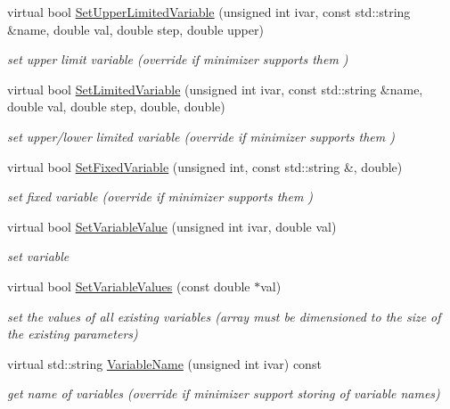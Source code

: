 \begin{DoxyCompactItemize}
virtual bool \mbox{\hyperlink{classROOT_1_1Minuit2_1_1Minuit2Minimizer_a70209b37c419af5d8d1475ce8de29b43}{Set\+Upper\+Limited\+Variable}} (unsigned int ivar, const std\+::string \&name, double val, double step, double upper)
\begin{DoxyCompactList}\small\item\em set upper limit variable (override if minimizer supports them ) \end{DoxyCompactList}\item 
virtual bool \mbox{\hyperlink{classROOT_1_1Minuit2_1_1Minuit2Minimizer_a30385295df6a6b784aa59de7f00e4d23}{Set\+Limited\+Variable}} (unsigned int ivar, const std\+::string \&name, double val, double step, double, double)
\begin{DoxyCompactList}\small\item\em set upper/lower limited variable (override if minimizer supports them ) \end{DoxyCompactList}\item 
virtual bool \mbox{\hyperlink{classROOT_1_1Minuit2_1_1Minuit2Minimizer_af42341b80ebb02d8c0882beaa781e7bd}{Set\+Fixed\+Variable}} (unsigned int, const std\+::string \&, double)
\begin{DoxyCompactList}\small\item\em set fixed variable (override if minimizer supports them ) \end{DoxyCompactList}\item 
virtual bool \mbox{\hyperlink{classROOT_1_1Minuit2_1_1Minuit2Minimizer_a474e05b30c1227e9cc39fb597027f426}{Set\+Variable\+Value}} (unsigned int ivar, double val)
\begin{DoxyCompactList}\small\item\em set variable \end{DoxyCompactList}\item 
virtual bool \mbox{\hyperlink{classROOT_1_1Minuit2_1_1Minuit2Minimizer_a9511e9711f3d1505556af30046c87d03}{Set\+Variable\+Values}} (const double $\ast$val)
\begin{DoxyCompactList}\small\item\em set the values of all existing variables (array must be dimensioned to the size of the existing parameters) \end{DoxyCompactList}\item 
virtual std\+::string \mbox{\hyperlink{classROOT_1_1Minuit2_1_1Minuit2Minimizer_a8f5a6dc65fdfeb0351039d80f7c94968}{Variable\+Name}} (unsigned int ivar) const
\begin{DoxyCompactList}\small\item\em get name of variables (override if minimizer support storing of variable names) \end{DoxyCompactList}\item 

\end{DoxyCompactItemize}
